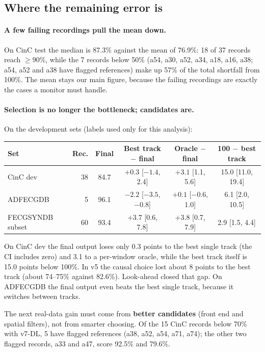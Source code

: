 \documentclass[11pt]{article}
\begin{document}
\subsection{Where the remaining error is}
\label{sec:where}
\paragraph{A few failing recordings pull the mean down.} On CinC test the median is 87.3\% against the mean of 76.9\%: 18 of 37 records reach $\ge 90\%$, while the 7 records below 50\% (a54, a30, a52, a34, a18, a16, a38; a54, a52 and a38 have flagged references) make up 57\% of the total shortfall from 100\%. The mean stays our main figure, because the failing recordings are exactly the cases a monitor must handle.

\paragraph{Selection is no longer the bottleneck; candidates are.} On the development sets (labels used only for this analysis):
\begin{center}
\small
\begin{tabular}{@{}lrcccc@{}}
\toprule
\textbf{Set} & \textbf{Rec.} & \textbf{Final} & \textbf{Best track $-$ final} & \textbf{Oracle $-$ final} & \textbf{100 $-$ best track} \\
\midrule
CinC dev & 38 & 84.7 & $+0.3$ [$-1.4$, 2.4] & $+3.1$ [1.1, 5.6] & 15.0 [11.0, 19.4] \\
ADFECGDB & 5 & 96.1 & $-2.2$ [$-3.5$, $-0.8$] & $+0.1$ [$-0.6$, 1.0] & 6.1 [2.0, 10.5] \\
FECGSYNDB subset & 60 & 93.4 & $+3.7$ [0.6, 7.8] & $+3.8$ [0.7, 7.9] & 2.9 [1.5, 4.4] \\
\bottomrule
\end{tabular}
\end{center}
On CinC dev the final output loses only 0.3 points to the best single track (the CI includes zero) and 3.1 to a per-window oracle, while the best track itself is 15.0 points below 100\%. In v5 the causal choice lost about 8 points to the best track (about 74--75\% against 82.6\%). Look-ahead closed that gap. On ADFECGDB the final output even beats the best single track, because it switches between tracks.

\begin{keyfact}
The next real-data gain must come from \textbf{better candidates} (front end and spatial filters), not from smarter choosing. Of the 15 CinC records below 70\% with v7-DL, 5 have flagged references (a38, a52, a54, a71, a74); the other two flagged records, a33 and a47, score 92.5\% and 79.6\%.
\end{keyfact}
\end{document}
